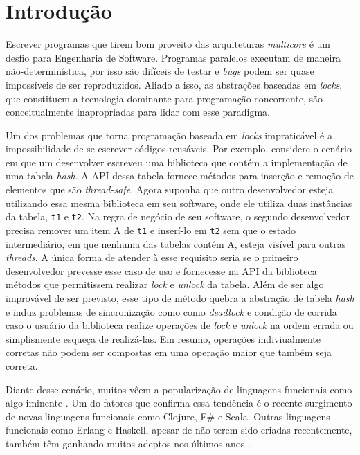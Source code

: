 \chapter{Introdução}

Escrever programas que tirem bom proveito das arquiteturas \emph{multicore} é um desfio para Engenharia de Software. Programas paralelos executam de maneira não-determinística, por isso são difíceis de testar e \emph{bugs} podem ser quase impossíveis de ser reproduzidos. Aliado a isso, as abstrações baseadas em \emph{locks}, que constituem a tecnologia dominante para programação concorrente, são conceitualmente inapropriadas para lidar com esse paradigma. \cite{jones2007beautiful}

Um dos problemas que torna programação baseada em \emph{locks} impraticável é a impossibilidade de se escrever códigos reusáveis. Por exemplo, considere o cenário em que um desenvolver escreveu uma biblioteca que contém a implementação de uma tabela \emph{hash}. A API dessa tabela fornece métodos para inserção e remoção de elementos que são \emph{thread-safe}. Agora suponha que outro desenvolvedor esteja utilizando essa mesma biblioteca em seu software, onde ele utiliza duas instâncias da tabela, \verb|t1| e \verb|t2|. Na regra de negócio de seu software, o segundo desenvolvedor precisa remover um item A de \verb|t1| e inserí-lo em \verb|t2| sem que o estado intermediário, em que nenhuma das tabelas contém A, esteja visível para outras \emph{threads}. A única forma de atender à esse requisito seria se o primeiro desenvolvedor prevesse esse caso de uso e fornecesse na API da biblioteca métodos que permitissem realizar \emph{lock} e \emph{unlock} da tabela. Além de ser algo improvável de ser previsto, esse tipo de método quebra a abstração de tabela \emph{hash} e induz problemas de sincronização como como \emph{deadlock} e condição de corrida caso o usuário da biblioteca realize operações de \emph{lock} e \emph{unlock} na ordem errada ou simplismente esqueça de realizá-las. Em resumo, operações indiviualmente corretas não podem ser compostas em uma operação maior que também seja correta. \cite{harris2005composable}

Diante desse cenário, muitos vêem a popularização de linguagens funcionais como algo iminente \cite{theeconomist}. Um do fatores que confirma essa tendência é o recente surgimento de novas linguagens funcionais como Clojure, F\# e Scala. Outras linguagens funcionais como Erlang e Haskell, apesar de não terem sido criadas recentemente, também têm ganhando muitos adeptos nos últimos anos \cite{ycombinator}.

